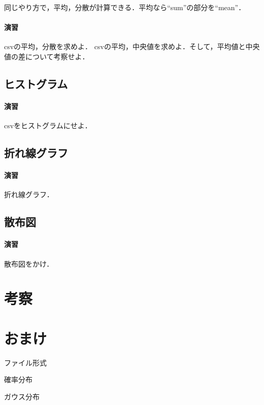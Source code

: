 \documentclass[12pt, a4j]{jreport}
\begin{document}
同じやり方で，平均，分散が計算できる．平均なら``sum''の部分を``mean''．

\paragraph{演習}
csvの平均，分散を求めよ．
csvの平均，中央値を求めよ．そして，平均値と中央値の差について考察せよ．

\subsection{ヒストグラム}




\paragraph{演習}
csvをヒストグラムにせよ．


\subsection{折れ線グラフ}



\paragraph{演習}
折れ線グラフ．



\subsection{散布図}

\paragraph{演習}
散布図をかけ．



\section{考察}



\section{おまけ}

ファイル形式

確率分布

ガウス分布
\end{document}
